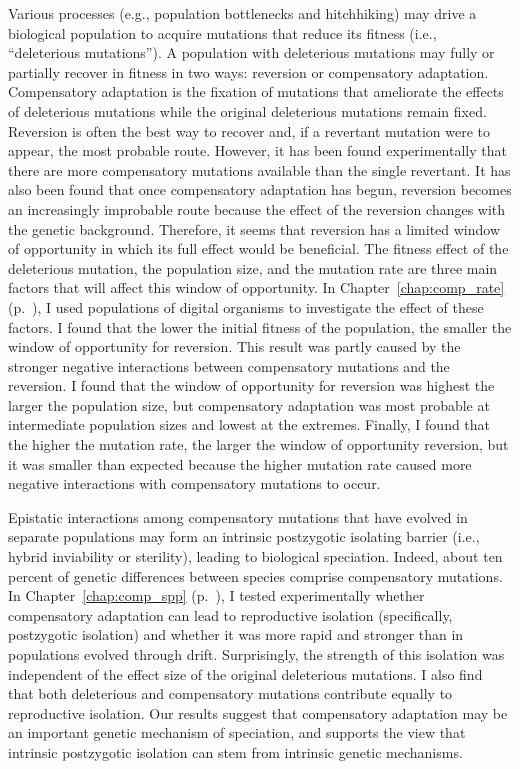 \begin{doublespace}
Various processes (e.g., population bottlenecks and hitchhiking)
may drive a biological population to acquire mutations
that reduce its fitness (i.e., ``deleterious mutations'').
%
A population with deleterious mutations may fully or partially recover
in fitness in two ways: reversion or compensatory adaptation.
%
Compensatory adaptation is the fixation of mutations
that ameliorate the effects of deleterious mutations
while the original deleterious mutations remain fixed.
%
Reversion is often the best way to recover and,
if a revertant mutation were to appear, the most probable route.
%
However, it has been found experimentally that
there are more compensatory mutations available
than the single revertant.
%
It has also been found that once compensatory adaptation
has begun, reversion becomes an increasingly improbable route
because the effect of the reversion changes with the genetic background.
%
Therefore, it seems that reversion has a limited
window of opportunity in which its full effect would be beneficial.
%
The fitness effect of the deleterious mutation,
the population size, and the mutation rate are three main factors
that will affect this window of opportunity.
%
In Chapter~\ref{chap:comp_rate} (p.~\pageref{chap:comp_rate}),
I used populations of digital organisms
to investigate the effect of these factors.
%
I found that the lower the initial fitness of the population,
the smaller the window of opportunity for reversion.
%
This result was partly caused by the stronger negative interactions
between compensatory mutations and the reversion.
%
I found that the window of opportunity for reversion
was highest the larger the population size,
but compensatory adaptation was most probable
at intermediate population sizes and lowest at the extremes.
%
Finally, I found that the higher the mutation rate,
the larger the window of opportunity reversion,
but it was smaller than expected because
the higher mutation rate caused more negative interactions
with compensatory mutations to occur.



Epistatic interactions among compensatory mutations that have
evolved in separate populations may form an intrinsic
postzygotic isolating barrier (i.e., hybrid inviability or sterility),
leading to biological speciation.
%
Indeed, about ten percent of genetic differences between species
comprise compensatory mutations.
%
In Chapter~\ref{chap:comp_spp} (p.~\pageref{chap:comp_spp}),
I tested experimentally whether compensatory adaptation
can lead to reproductive isolation (specifically, postzygotic isolation)
and whether it was more rapid and stronger
than in populations evolved through drift.
%
Surprisingly, the strength of this isolation was independent
of the effect size of the original deleterious mutations.
%
I also find that
both deleterious and compensatory mutations
contribute equally to reproductive isolation.
%
Our results suggest that compensatory adaptation may be
an important genetic mechanism of speciation,
and supports the view that intrinsic postzygotic isolation
can stem from intrinsic genetic mechanisms.




\end{doublespace}
